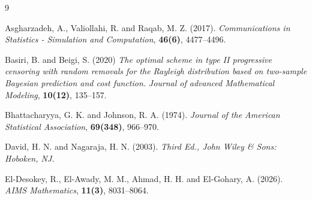 \documentclass[twoside]{article}
\begin{document}
\begin{thebibliography}{9}

Asgharzadeh, A., Valiollahi, R. and  Raqab, M. Z. (2017).
\newblock \emph{Communications in Statistics - Simulation and Computation}, \textbf{46(6)}, 4477--4496.





Basiri, B. and Beigi, S. (2020)
\newblock \emph{The optimal scheme in type II progressive censoring with random removals for the Rayleigh distribution based on two-sample Bayesian prediction and cost function.} \newblock \emph{Journal of advanced Mathematical Modeling}, \textbf{10(12)}, 135--157.

 Bhattacharyya, G. K. and  Johnson, R. A. (1974).
\newblock \emph{Journal of the American Statistical Association}, \textbf{69(348)}, 966--970.

David, H. N. and  Nagaraja, H. N. (2003).
\newblock \emph{Third Ed., John Wiley \& Sons: Hoboken, NJ.}

El-Desokey, R., El-Awady, M. M., Ahmad, H. H. and  El-Gohary, A. (2026).
\newblock \emph{AIMS Mathematics}, \textbf{11(3)}, 8031--8064.


\end{thebibliography}
\end{document}

